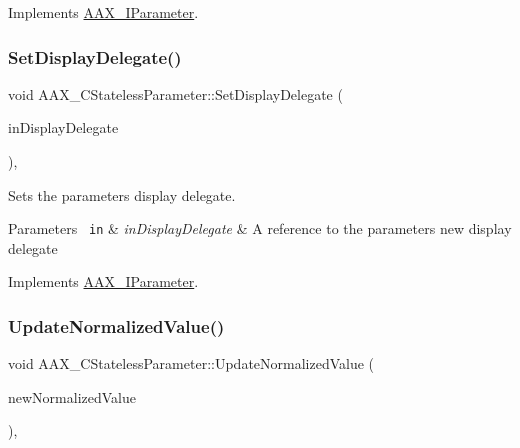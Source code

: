 Implements \mbox{\hyperlink{a01857_a809a5c7f712ed2e5c55e30b6d5557c59}{A\+A\+X\+\_\+\+I\+Parameter}}.

\mbox{\label{a01541_a6d95b6d343041491d85e4d466fc4b049}} 
\subsubsection{\texorpdfstring{SetDisplayDelegate()}{SetDisplayDelegate()}}
{\footnotesize\ttfamily void A\+A\+X\+\_\+\+C\+Stateless\+Parameter\+::\+Set\+Display\+Delegate (\begin{DoxyParamCaption}\item[{\mbox{\hyperlink{a01797}{A\+A\+X\+\_\+\+I\+Display\+Delegate\+Base}} \&}]{in\+Display\+Delegate }\end{DoxyParamCaption})\hspace{0.3cm}{\ttfamily [inline]}, {\ttfamily [virtual]}}



Sets the parameter\textquotesingle{}s display delegate. 


\begin{DoxyParams}[1]{Parameters}
\mbox{\texttt{ in}}  & {\em in\+Display\+Delegate} & A reference to the parameter\textquotesingle{}s new display delegate \\
\hline
\end{DoxyParams}


Implements \mbox{\hyperlink{a01857_a16a75d76f077051eb6f852cde28f5152}{A\+A\+X\+\_\+\+I\+Parameter}}.

\mbox{\label{a01541_a5710b949f27dbe2c3d81589983efc008}} 
\subsubsection{\texorpdfstring{UpdateNormalizedValue()}{UpdateNormalizedValue()}}
{\footnotesize\ttfamily void A\+A\+X\+\_\+\+C\+Stateless\+Parameter\+::\+Update\+Normalized\+Value (\begin{DoxyParamCaption}\item[{double}]{new\+Normalized\+Value }\end{DoxyParamCaption})\hspace{0.3cm}{\ttfamily [inline]}, {\ttfamily [virtual]}}



